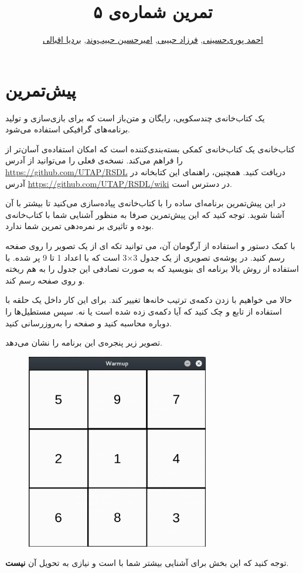 \documentclass{utap}
\title{تمرین شماره‌ی ۵}
\author{
	\href{mailto:seyedahmadpourihosseini@gmail.com?subject=[AP\%20S98\%20A5]\%20}{احمد پوری‌حسینی},
	\href{mailto:farzadhabibii98@gmail.com?subject=[AP\%20S98\%20A5]\%20}{فرزاد حبیبی},
	\href{mailto:ahhabibvand@gmail.com?subject=[AP\%20S98\%20A5]\%20}{امیرحسین حبیب‌وند},
	\href{mailto:bardia.eghbali@gmail.com??subject=[AP\%20S98\%20A5]\%20}{بردیا اقبالی}
}
\begin{document}
	\maketitle

	\section{پیش‌تمرین }

  یک کتاب‌خانه‌ی چندسکویی، رایگان و متن‌باز است که برای بازی‌سازی و تولید برنامه‌های گرافیکی استفاده می‌شود.

کتاب‌خانه‌ی  یک کتاب‌خانه‌ی کمکی بسته‌بندی‌کننده است که امکان استفاده‌ی آسان‌تر از  را فراهم می‌کند.
نسخه‌ی فعلی  را می‌توانید از آدرس \url{https://github.com/UTAP/RSDL} دریافت کنید. همچنین، راهنمای این کتابخانه در آدرس \url{https://github.com/UTAP/RSDL/wiki} در دسترس است.

در این پیش‌تمرین برنامه‌ای ساده را با کتاب‌خانه‌ی  پیاده‌سازی می‌کنید تا بیشتر با آن آشنا شوید.  توجه کنید که این پیش‌تمرین صرفا به منظور آشنایی شما با کتاب‌خانه‌ی  بوده و تاثیری بر نمره‌‌دهی تمرین شما ندارد.


با کمک دستور  و استفاده از آرگومان  آن، می توانید تکه ای از یک تصویر را روی صفحه رسم کنید. در پوشه‌ی  تصویری از یک جدول 3×3 است که با اعداد 1 تا 9 پر شده. با استفاده از روش بالا برنامه ای بنویسید که به صورت تصادفی این جدول را به هم ریخته و روی صفحه رسم کند.

حالا می خواهیم با زدن دکمه‌ی  ترتیب خانه‌ها تغییر کند. برای این کار داخل یک حلقه با استفاده از تابع  و  چک کنید که آیا دکمه‌ی  زده شده است یا نه. سپس مستطیل‌ها را دوباره محاسبه کنید و صفحه را به‌روزرسانی کنید.

تصویر زیر پنجره‌ی این برنامه را نشان می‌دهد.
	\begin{figure}[H]
	\begin{center}
		\includegraphics[width=8cm]{warmup.png}
	\end{center}
	\end{figure}
توجه کنید که این بخش برای آشنایی بیشتر شما با  است و نیازی به تحویل آن \textbf{نیست}.
\end{document}
